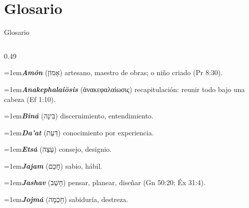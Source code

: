 \documentclass[hyperref={bookmarks=false},aspectratio=169]{beamer}
\newcommand{\heb}[1]{\mbox{\foreignlanguage{hebrew}{#1}}}
\newcommand{\grc}[1]{\foreignlanguage{ancientgreek}{#1}}
\begin{document}
\section{Glosario}

\begin{frame}{Glosario}
\scriptsize\RaggedRight
\begin{columns}[t,onlytextwidth]
\begin{column}{0.49\textwidth}

\par\noindent\hangindent=1em{\color{azul}\textbf{\emph{Amón}}} (\heb{אָמוֹן}) artesano, maestro de obras; o niño criado (Pr 8:30).\par\vspace{2pt}
\par\noindent\hangindent=1em{\color{azul}\textbf{\emph{Anakephalaiōsis}}} (\grc{ἀνακεφαλαίωσις}) recapitulación: reunir todo bajo una cabeza (Ef 1:10).\par\vspace{2pt}
\par\noindent\hangindent=1em{\color{azul}\textbf{\emph{Biná}}} (\heb{בִּינָה}) discernimiento, entendimiento.\par\vspace{2pt}
\par\noindent\hangindent=1em{\color{azul}\textbf{\emph{Da'at}}} (\heb{דַּעַת}) conocimiento por experiencia.\par\vspace{2pt}
\par\noindent\hangindent=1em{\color{azul}\textbf{\emph{Etsá}}} (\heb{עֵצָה}) consejo, designio.\par\vspace{2pt}
\par\noindent\hangindent=1em{\color{azul}\textbf{\emph{Jajam}}} (\heb{חָכָם}) sabio, hábil.\par\vspace{2pt}
\par\noindent\hangindent=1em{\color{azul}\textbf{\emph{Jashav}}} (\heb{חָשַׁב}) pensar, planear, diseñar (Gn 50:20; Éx 31:4).\par\vspace{2pt}
\par\noindent\hangindent=1em{\color{azul}\textbf{\emph{Jojmá}}} (\heb{חָכְמָה}) sabiduría, destreza.\par\vspace{2pt}


\end{column}
\end{columns}
\end{frame}
\end{document}
